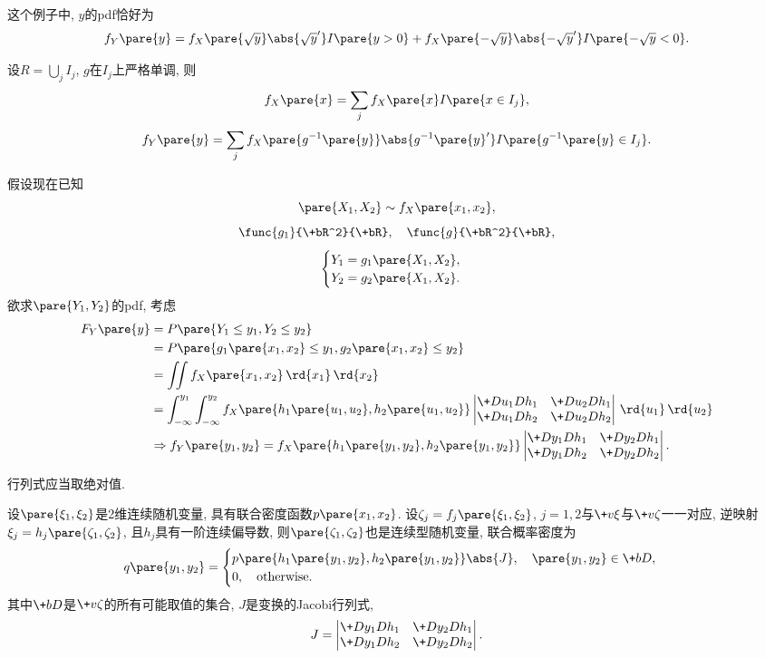 \documentclass{ctexart}
\begin{document}
这个例子中, $y$的pdf恰好为
\[ f_Y\pare{y} = f_X\pare{\sqrt{y}}\abs{\sqrt{y}'}I\pare{y>0} + f_X\pare{-\sqrt{y}}\abs{-\sqrt{y}'}I\pare{-\sqrt{y} < 0}. \]
\begin{theorem}
    设$R = \bigcup_j I_j$, $g$在$I_j$上严格单调, 则
    \[ f_X\pare{x} = \sum_j f_X\pare{x} I\pare{x\in I_j}, \]
    \[ f_Y\pare{y} = \sum_j f_X\pare{g^{-1}\pare{y}}\abs{g^{-1}\pare{y}'}I\pare{g^{-1}\pare{y}\in I_j}. \]
\end{theorem}
假设现在已知
\[ \pare{X_1,X_2}\sim f_X\pare{x_1,x_2}, \]
\[ \func{g_1}{\+bR^2}{\+bR},\quad \func{g}{\+bR^2}{\+bR}, \]
\[ \begin{cases}
    Y_1 = g_1\pare{X_1,X_2}, \\
    Y_2 = g_2\pare{X_1,X_2}.
\end{cases} \]
欲求$\pare{Y_1,Y_2}$的pdf, 考虑
\begin{align*}
    F_Y\pare{y} &= P\pare{Y_1 \le y_1, Y_2 \le y_2} \\
    &= P\pare{g_1\pare{x_1,x_2}\le y_1, g_2\pare{x_1,x_2}\le y_2} \\
    &= \iint f_X\pare{x_1,x_2}\,\rd{x_1}\,\rd{x_2} \\
    &= \int_{-\infty}^{y_1}\int_{-\infty}^{y_2} f_X\pare{h_1\pare{u_1,u_2},h_2\pare{u_1,u_2}} \begin{vmatrix}
        \+D{u_1}D{h_1} & \+D{u_2}D{h_1} \\
        \+D{u_1}D{h_2} & \+D{u_2}D{h_2} 
    \end{vmatrix}\,\rd{u_1}\,\rd{u_2} \\
    &\Rightarrow f_Y\pare{y_1,y_2} = f_X\pare{h_1\pare{y_1,y_2},h_2\pare{y_1,y_2}} \begin{vmatrix}
        \+D{y_1}D{h_1} & \+D{y_2}D{h_1} \\
        \+D{y_1}D{h_2} & \+D{y_2}D{h_2} 
    \end{vmatrix}.
\end{align*}
\begin{remark}
    行列式应当取绝对值.
\end{remark}
\begin{theorem}
    设$\pare{\xi_1,\xi_2}$是2维连续随机变量, 具有联合密度函数$p\pare{x_1,x_2}$. 设$\zeta_j = f_j\pare{\xi_1,\xi_2}$, $j=1,2$与$\+v\xi$与$\+v\zeta$一一对应, 逆映射$\xi_j = h_j\pare{\zeta_1,\zeta_2}$, 且$h_j$具有一阶连续偏导数, 则$\pare{\zeta_1,\zeta_2}$也是连续型随机变量, 联合概率密度为
    \[ q\pare{y_1,y_2} = \begin{cases}
        p\pare{h_1\pare{y_1,y_2},h_2\pare{y_1,y_2}}\abs{J},\quad \pare{y_1,y_2}\in \+bD, \\
        0,\quad \mathrm{otherwise}. \\
    \end{cases} \]
    其中$\+bD$是$\+v\zeta$的所有可能取值的集合, $J$是变换的Jacobi行列式,
    \[ J = \begin{vmatrix}
        \+D{y_1}D{h_1} & \+D{y_2}D{h_1} \\
        \+D{y_1}D{h_2} & \+D{y_2}D{h_2} 
    \end{vmatrix}. \]
\end{theorem}
\end{document}
